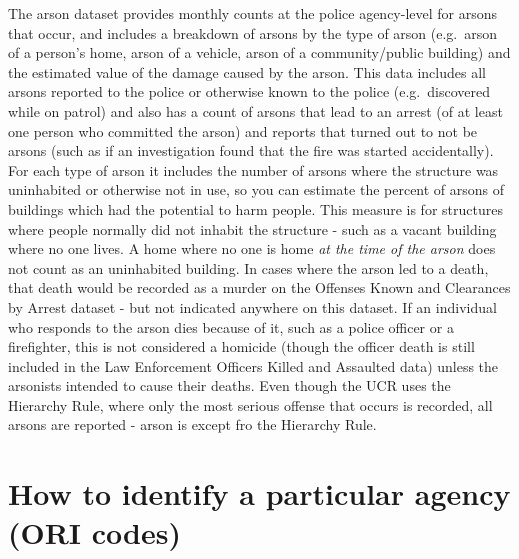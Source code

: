 \documentclass[
  12pt,
  openany]{book}
\begin{document}
The arson dataset provides monthly counts at the police agency-level for arsons that occur, and includes a breakdown of arsons by the type of arson (e.g.~arson of a person's home, arson of a vehicle, arson of a community/public building) and the estimated value of the damage caused by the arson. This data includes all arsons reported to the police or otherwise known to the police (e.g.~discovered while on patrol) and also has a count of arsons that lead to an arrest (of at least one person who committed the arson) and reports that turned out to not be arsons (such as if an investigation found that the fire was started accidentally). For each type of arson it includes the number of arsons where the structure was uninhabited or otherwise not in use, so you can estimate the percent of arsons of buildings which had the potential to harm people. This measure is for structures where people normally did not inhabit the structure - such as a vacant building where no one lives. A home where no one is home \emph{at the time of the arson} does not count as an uninhabited building. In cases where the arson led to a death, that death would be recorded as a murder on the Offenses Known and Clearances by Arrest dataset - but not indicated anywhere on this dataset. If an individual who responds to the arson dies because of it, such as a police officer or a firefighter, this is not considered a homicide (though the officer death is still included in the Law Enforcement Officers Killed and Assaulted data) unless the arsonists intended to cause their deaths. Even though the UCR uses the Hierarchy Rule, where only the most serious offense that occurs is recorded, all arsons are reported - arson is except fro the Hierarchy Rule.

\hypertarget{how-to-identify-a-particular-agency-ori-codes}{%
\section{How to identify a particular agency (ORI codes)}\label{how-to-identify-a-particular-agency-ori-codes}}
\end{document}
